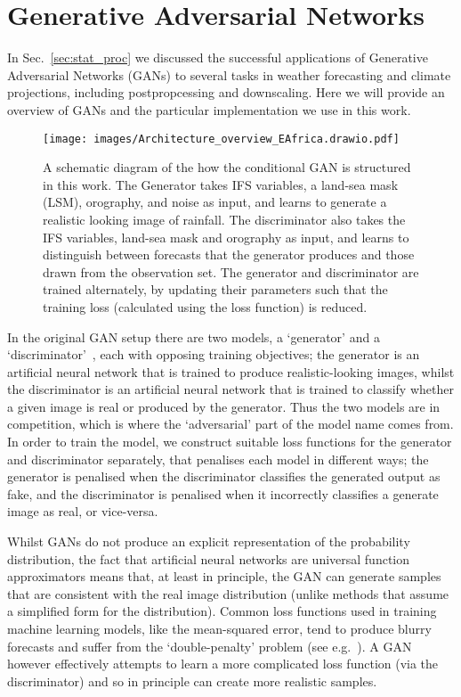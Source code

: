 \documentclass[../main.tex]{subfiles}
\begin{document}
\section{Generative Adversarial Networks}
\label{sec:gans}

In Sec.~\ref{sec:stat_proc} we discussed the successful applications of Generative Adversarial Networks (GANs) to several tasks in weather forecasting and climate projections, including postpropcessing and downscaling. Here we will provide an overview of GANs and the particular implementation we use in this work.

     
\begin{figure}[ht!]
     \centering
         \texttt{[image: images/Architecture\_overview\_EAfrica.drawio.pdf]}
         \caption{A schematic diagram of the how the conditional GAN is structured in this work. The Generator takes IFS variables, a land-sea mask (LSM), orography, and noise as input, and learns to generate a realistic looking image of rainfall. The discriminator also takes the IFS variables, land-sea mask and orography as input, and learns to distinguish between forecasts that the generator produces and those drawn from the observation set. The generator and discriminator are trained alternately, by updating their parameters such that the training loss (calculated using the loss function) is reduced.}
         \label{fig:gan_schematic} 
\end{figure}    


In the original GAN setup there are two models, a `generator' and a `discriminator'~\citep{goodfellow_generative_2014}, each with opposing training objectives; the generator is an artificial neural network that is trained to produce realistic-looking images, whilst the discriminator is an artificial neural network that is trained to classify whether a given image is real or produced by the generator. Thus the two models are in competition, which is where the `adversarial' part of the model name comes from. In order to train the model, we construct suitable loss functions for the generator and discriminator separately, that penalises each model in different ways; the generator is penalised when the discriminator classifies the generated output as fake, and the discriminator is penalised when it incorrectly classifies a generate image as real, or vice-versa. 

Whilst GANs do not produce an explicit representation of the probability distribution, the fact that artificial neural networks are universal function approximators means that, at least in principle, the GAN can generate samples that are consistent with the real image distribution (unlike methods that assume a simplified form for the distribution). Common loss functions used in training machine learning models, like the mean-squared error, tend to produce blurry forecasts and suffer from the `double-penalty' problem (see e.g.~\cite{wilks_forecast_2019}). A GAN however effectively attempts to learn a more complicated loss function (via the discriminator) and so in principle can create more realistic samples.
\end{document}
